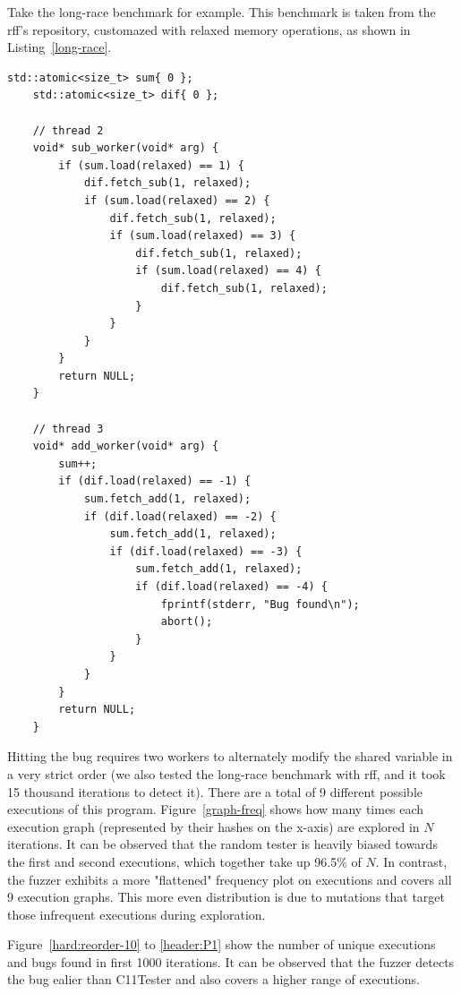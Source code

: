 Take the long-race benchmark for example. This benchmark is taken from the rff's repository, customazed with relaxed memory operations, as shown in Listing~\ref{long-race}.

\begin{lstlisting}[caption={long-race}, label={long-race}]
	std::atomic<size_t> sum{ 0 };
	std::atomic<size_t> dif{ 0 };
	
	// thread 2
	void* sub_worker(void* arg) {
		if (sum.load(relaxed) == 1) {
			dif.fetch_sub(1, relaxed);
			if (sum.load(relaxed) == 2) {
				dif.fetch_sub(1, relaxed);
				if (sum.load(relaxed) == 3) {
					dif.fetch_sub(1, relaxed);
					if (sum.load(relaxed) == 4) {
						dif.fetch_sub(1, relaxed);
					}
				}
			}
		}
		return NULL;
	}
	
	// thread 3
	void* add_worker(void* arg)	{
		sum++;
		if (dif.load(relaxed) == -1) {
			sum.fetch_add(1, relaxed);
			if (dif.load(relaxed) == -2) {
				sum.fetch_add(1, relaxed);
				if (dif.load(relaxed) == -3) {
					sum.fetch_add(1, relaxed);
					if (dif.load(relaxed) == -4) {
						fprintf(stderr, "Bug found\n");
						abort();
					}
				}
			}
		}
		return NULL;
	}
\end{lstlisting}

Hitting the bug requires two workers to alternately modify the shared variable in a very strict order (we also tested the long-race benchmark with rff, and it took 15 thousand iterations to detect it). There are a total of 9 different possible  executions of this program. Figure~\ref{graph-freq} shows how many times each execution graph (represented by their hashes on the x-axis) are explored in $N$ iterations. It can be observed that the random tester is heavily biased towards the first and second executions, which together take up 96.5\% of $N$. In contrast, the fuzzer exhibits a more "flattened" frequency plot on executions and covers all 9 execution graphs. This more even distribution is due to mutations that target those infrequent executions during exploration.

Figure~\ref{hard:reorder-10} to \ref{header:P1} show the number of unique executions and bugs found in first 1000 iterations. It can be observed that the fuzzer detects the bug ealier than C11Tester and also covers a higher range of executions.

